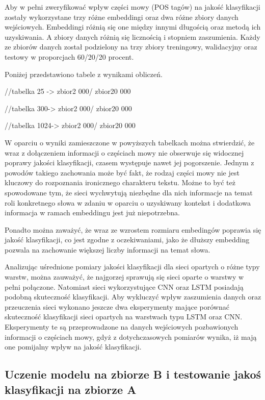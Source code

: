 Aby w pełni zweryfikować wpływ części mowy (POS tagów) na jakość klasyfikacji zostały wykorzystane trzy różne embeddingi oraz dwa różne zbiory danych wejściowych. Embeddingi różnią się one między innymi długością oraz metodą ich uzyskiwania. A zbiory danych różnią się licznością i stopniem zaszumienia. Każdy ze zbiorów danych został podzielony na trzy zbiory treningowy, walidacyjny oraz testowy w proporcjach 60/20/20 procent. 

Poniżej przedstawiono tabele z wynikami obliczeń. 

//tabelka 25 -> zbior2 000/ zbior20 000 

//tabelka 300-> zbior2 000/ zbior20 000 

//tabelka 1024-> zbior2 000/ zbior20 000 

W oparciu o wyniki zamieszczone w powyższych tabelkach można stwierdzić, że wraz z dołączeniem informacji o częściach mowy nie obserwuje się widocznej poprawy jakości klasyfikacji, czasem występuje nawet jej pogorszenie. Jednym z powodów takiego zachowania może być fakt, że rodzaj części mowy nie jest kluczowy do rozpoznania ironicznego charakteru tekstu. Możne to być też spowodowane tym, że sieci wychwytują niezbędne dla nich informacje na temat roli konkretnego słowa w zdaniu w oparciu o uzyskiwany kontekst i dodatkowa informacja w ramach embeddingu jest już niepotrzebna. 

Ponadto można zaważyć, że wraz ze wzrostem rozmiaru embedingów poprawia się jakość klasyfikacji, co jest zgodne z oczekiwaniami, jako że dłuższy embedding pozwala na zachowanie większej liczby informacji na temat słowa. 


Analizując uśrednione pomiary jakości klasyfikacji dla sieci opartych o różne typy warstw, można zauważyć, że najgorzej sprawują się sieci oparte o warstwy w pełni połączone. Natomiast sieci wykorzystujące CNN oraz LSTM posiadają podobną skuteczność klasyfikacji. Aby wykluczyć wpływ zaszumienia danych oraz przeuczenia sieci wykonano jeszcze dwa eksperymenty mające porównać skuteczność klasyfikacji sieci opartych na warstwach typu LSTM oraz CNN. Eksperymenty te są przeprowadzone na danych wejściowych pozbawionych informacji o częściach mowy, gdyż z dotychczasowych pomiarów wynika, iż mają one pomijalny wpływ na jakość klasyfikacji. 

\subsection{Uczenie modelu na zbiorze B i testowanie jakoś klasyfikacji na zbiorze A }

